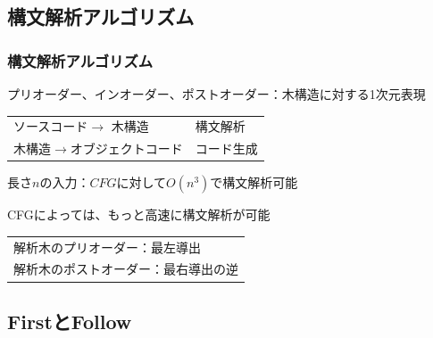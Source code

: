 \documentclass[dvipdfmx]{beamer}
\begin{document}


\subsection{構文解析アルゴリズム}

\begin{frame}
  \frametitle{構文解析アルゴリズム}

  プリオーダー、インオーダー、ポストオーダー：木構造に対する1次元表現

  \begin{center}
    \begin{tabular}{ll}
      ソースコード$\rightarrow$ 木構造   & 構文解析  \\
      木構造$\rightarrow$オブジェクトコード & コード生成
    \end{tabular}
  \end{center}

  長さ$n$の入力：$CFG$に対して$O(n^3)$で構文解析可能\\

  CFGによっては、もっと高速に構文解析が可能\\

  \vspace*{1zw}

  \begin{tabular}{l}
    解析木のプリオーダー：最左導出 \\
    解析木のポストオーダー：最右導出の逆
  \end{tabular}

\end{frame}

\subsection{FirstとFollow}
\end{document}
